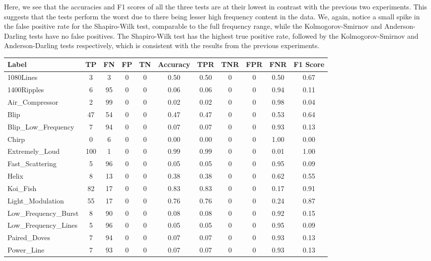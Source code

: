 \documentclass[12pt]{article}
\begin{document}
\noindent Here, we see that the accuracies and F1 scores of all the three tests are at their lowest in contrast with the previous two experiments. This suggests that the tests perform the worst due to there being lesser high frequency content in the data. We, again, notice a small spike in the false positive rate for the Shapiro-Wilk test, comparable to the full frequency range, while the Kolmogorov-Smirnov and Anderson-Darling tests have no false positives. The Shapiro-Wilk test has the highest true positive rate, followed by the Kolmogorov-Smirnov and Anderson-Darling tests respectively, which is consistent with the results from the previous experiments.

\begin{table}[H]
  \begin{tabular}{lcccccccccc}
  \toprule
  Label & TP & FN & FP & TN & Accuracy & TPR & TNR & FPR & FNR & F1 Score \\
  \midrule
  1080Lines & 3 & 3 & 0 & 0 & 0.50 & 0.50 & 0 & 0 & 0.50 & 0.67 \\
  1400Ripples & 6 & 95 & 0 & 0 & 0.06 & 0.06 & 0 & 0 & 0.94 & 0.11 \\
  Air\_Compressor & 2 & 99 & 0 & 0 & 0.02 & 0.02 & 0 & 0 & 0.98 & 0.04 \\
  Blip & 47 & 54 & 0 & 0 & 0.47 & 0.47 & 0 & 0 & 0.53 & 0.64 \\
  Blip\_Low\_Frequency & 7 & 94 & 0 & 0 & 0.07 & 0.07 & 0 & 0 & 0.93 & 0.13 \\
  Chirp & 0 & 6 & 0 & 0 & 0.00 & 0.00 & 0 & 0 & 1.00 & 0.00 \\
  Extremely\_Loud & 100 & 1 & 0 & 0 & 0.99 & 0.99 & 0 & 0 & 0.01 & 1.00 \\
  Fast\_Scattering & 5 & 96 & 0 & 0 & 0.05 & 0.05 & 0 & 0 & 0.95 & 0.09 \\
  Helix & 8 & 13 & 0 & 0 & 0.38 & 0.38 & 0 & 0 & 0.62 & 0.55 \\
  Koi\_Fish & 82 & 17 & 0 & 0 & 0.83 & 0.83 & 0 & 0 & 0.17 & 0.91 \\
  Light\_Modulation & 55 & 17 & 0 & 0 & 0.76 & 0.76 & 0 & 0 & 0.24 & 0.87 \\
  Low\_Frequency\_Burst & 8 & 90 & 0 & 0 & 0.08 & 0.08 & 0 & 0 & 0.92 & 0.15 \\
  Low\_Frequency\_Lines & 5 & 96 & 0 & 0 & 0.05 & 0.05 & 0 & 0 & 0.95 & 0.09 \\
  Paired\_Doves & 7 & 94 & 0 & 0 & 0.07 & 0.07 & 0 & 0 & 0.93 & 0.13 \\
  Power\_Line & 7 & 93 & 0 & 0 & 0.07 & 0.07 & 0 & 0 & 0.93 & 0.13 \\

\end{tabular}
\end{table}
\end{document}
